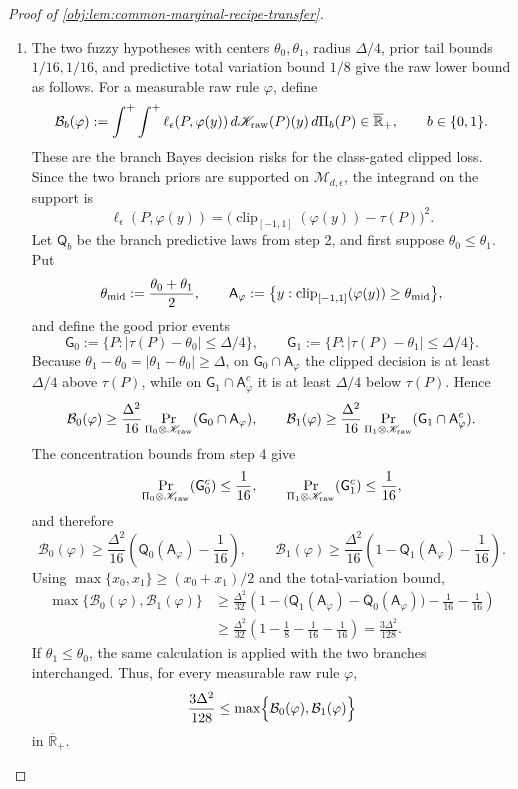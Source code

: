 \begin{proof}[Proof of \cref{obj:lem:common-marginal-recipe-transfer}]
\begin{enumerate}
\item The two fuzzy hypotheses with centers \(\theta_0,\theta_1\), radius \(\Delta/4\), prior tail bounds \(1/16,1/16\), and predictive total variation bound \(1/8\) give the raw lower bound as follows.  For a measurable raw rule \(\varphi\), define
\[
\mathcal B_b(\varphi)
:=
\int^{+}
\int^{+}
\ell_\epsilon(P,\varphi(y))\,d\mathscr K_{\rm raw}(P)(y)\,d\Pi_b(P)
\in\overline{\mathbb R}_+,
\qquad b\in\{0,1\}.
\]
These are the branch Bayes decision risks for the class-gated clipped loss.  Since the two branch priors are supported on \(\mathcal M_{d,\epsilon}\), the integrand on the support is
\[
\ell_\epsilon(P,\varphi(y))
=
\bigl(\operatorname{clip}_{[-1,1]}(\varphi(y))-\tau(P)\bigr)^2.
\]
Let \(\mathsf Q_b\) be the branch predictive laws from step 2, and first suppose \(\theta_0\le\theta_1\).  Put
\[
\theta_{\rm mid}:=\frac{\theta_0+\theta_1}{2},
\qquad
\mathsf A_\varphi
:=
\bigl\{y:\operatorname{clip}_{[-1,1]}(\varphi(y))\ge\theta_{\rm mid}\bigr\},
\]
and define the good prior events
\[
\mathsf G_0:=\bigl\{P:|\tau(P)-\theta_0|\le\Delta/4\bigr\},
\qquad
\mathsf G_1:=\bigl\{P:|\tau(P)-\theta_1|\le\Delta/4\bigr\}.
\]
Because \(\theta_1-\theta_0=|\theta_1-\theta_0|\ge\Delta\), on \(\mathsf G_0\cap\mathsf A_\varphi\) the clipped decision is at least \(\Delta/4\) above \(\tau(P)\), while on \(\mathsf G_1\cap\mathsf A_\varphi^c\) it is at least \(\Delta/4\) below \(\tau(P)\).  Hence
\[
\mathcal B_0(\varphi)
\ge
\frac{\Delta^2}{16}
\Pr_{\Pi_0\otimes\mathscr K_{\rm raw}}(\mathsf G_0\cap\mathsf A_\varphi),
\qquad
\mathcal B_1(\varphi)
\ge
\frac{\Delta^2}{16}
\Pr_{\Pi_1\otimes\mathscr K_{\rm raw}}(\mathsf G_1\cap\mathsf A_\varphi^c).
\]
The concentration bounds from step 4 give
\[
\Pr_{\Pi_0\otimes\mathscr K_{\rm raw}}(\mathsf G_0^c)\le\frac1{16},
\qquad
\Pr_{\Pi_1\otimes\mathscr K_{\rm raw}}(\mathsf G_1^c)\le\frac1{16},
\]
and therefore
\[
\mathcal B_0(\varphi)
\ge
\frac{\Delta^2}{16}\left(\mathsf Q_0(\mathsf A_\varphi)-\frac1{16}\right),
\qquad
\mathcal B_1(\varphi)
\ge
\frac{\Delta^2}{16}\left(1-\mathsf Q_1(\mathsf A_\varphi)-\frac1{16}\right).
\]
Using \(\max\{x_0,x_1\}\ge(x_0+x_1)/2\) and the total-variation bound,
\[
\begin{aligned}
\max\{\mathcal B_0(\varphi),\mathcal B_1(\varphi)\}
&\ge
\frac{\Delta^2}{32}
\left(1-\bigl(\mathsf Q_1(\mathsf A_\varphi)-\mathsf Q_0(\mathsf A_\varphi)\bigr)-\frac1{16}-\frac1{16}\right)\\
&\ge
\frac{\Delta^2}{32}
\left(1-\frac18-\frac1{16}-\frac1{16}\right)
=
\frac{3\Delta^2}{128}.
\end{aligned}
\]
If \(\theta_1\le\theta_0\), the same calculation is applied with the two branches interchanged.  Thus, for every measurable raw rule \(\varphi\),
\[
\frac{3\Delta^2}{128}
\le
\max\Bigl\{
\mathcal B_0(\varphi),\mathcal B_1(\varphi)
\Bigr\}
\]
in \(\overline{\mathbb R}_+\). %


\end{enumerate}
\end{proof}
